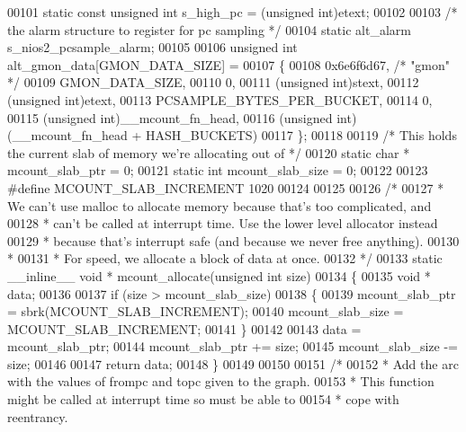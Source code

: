\begin{DoxyCode}
{00101 \textcolor{keyword}{static} \textcolor{keyword}{const} \textcolor{keywordtype}{unsigned} \textcolor{keywordtype}{int} s\_high\_pc = (\textcolor{keywordtype}{unsigned} int)etext;
00102 
00103 \textcolor{comment}{/* the alarm structure to register for pc sampling */}
00104 \textcolor{keyword}{static} alt_alarm s\_nios2\_pcsample\_alarm;
00105 
00106 \textcolor{keywordtype}{unsigned} \textcolor{keywordtype}{int} alt_gmon_data[GMON_DATA_SIZE] =
00107 \{
00108   0x6e6f6d67, \textcolor{comment}{/* "gmon" */}
00109   GMON_DATA_SIZE,
00110   0,
00111   (\textcolor{keywordtype}{unsigned} int)stext,
00112   (\textcolor{keywordtype}{unsigned} \textcolor{keywordtype}{int})etext,
00113   PCSAMPLE_BYTES_PER_BUCKET,
00114   0,
00115   (\textcolor{keywordtype}{unsigned} int)\_\_mcount\_fn\_head,
00116   (\textcolor{keywordtype}{unsigned} \textcolor{keywordtype}{int})(\_\_mcount\_fn\_head + HASH_BUCKETS)
00117 \};
00118 
00119 \textcolor{comment}{/* This holds the current slab of memory we're allocating out of */}
00120 \textcolor{keyword}{static} \textcolor{keywordtype}{char} * mcount_slab_ptr = 0;
00121 \textcolor{keyword}{static} \textcolor{keywordtype}{int}    mcount_slab_size = 0;
00122 
00123 \textcolor{preprocessor}{#define MCOUNT\_SLAB\_INCREMENT 1020}
00124 
00125 
00126 \textcolor{comment}{/*}
00127 \textcolor{comment}{ * We can't use malloc to allocate memory because that's too complicated, and}
00128 \textcolor{comment}{ * can't be called at interrupt time.  Use the lower level allocator instead}
00129 \textcolor{comment}{ * because that's interrupt safe (and because we never free anything).}
00130 \textcolor{comment}{ *}
00131 \textcolor{comment}{ * For speed, we allocate a block of data at once.}
00132 \textcolor{comment}{ */}
00133 \textcolor{keyword}{static} \_\_inline\_\_ \textcolor{keywordtype}{void} * mcount_allocate(\textcolor{keywordtype}{unsigned} \textcolor{keywordtype}{int} size)
00134 \{
00135   \textcolor{keywordtype}{void} * data;
00136 
00137   \textcolor{keywordflow}{if} (size > mcount\_slab\_size)
00138   \{
00139     mcount\_slab\_ptr = sbrk(MCOUNT_SLAB_INCREMENT);
00140     mcount\_slab\_size = MCOUNT_SLAB_INCREMENT;
00141   \}
00142 
00143   data = mcount_slab_ptr;
00144   mcount\_slab\_ptr += size;
00145   mcount\_slab\_size -= size;
00146 
00147   \textcolor{keywordflow}{return} data;
00148 \}
00149 
00150 
00151 \textcolor{comment}{/*}
00152 \textcolor{comment}{ * Add the arc with the values of frompc and topc given to the graph.}
00153 \textcolor{comment}{ * This function might be called at interrupt time so must be able to}
00154 \textcolor{comment}{ * cope with reentrancy.}
}
\end{DoxyCode}
